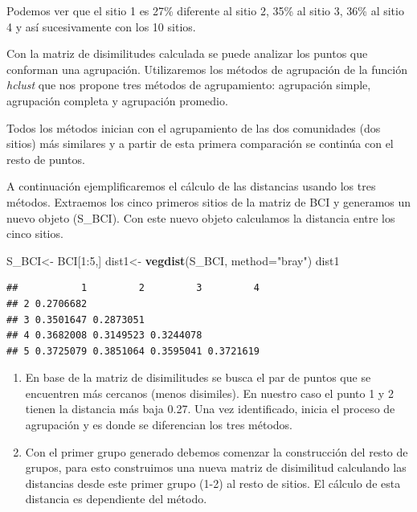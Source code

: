 \documentclass[]{book}
\newenvironment{Shaded}{\begin{snugshade}}{\end{snugshade}}
\newcommand{\KeywordTok}[1]{\textcolor[rgb]{0.13,0.29,0.53}{\textbf{{#1}}}}
\newcommand{\DataTypeTok}[1]{\textcolor[rgb]{0.13,0.29,0.53}{{#1}}}
\newcommand{\DecValTok}[1]{\textcolor[rgb]{0.00,0.00,0.81}{{#1}}}
\newcommand{\StringTok}[1]{\textcolor[rgb]{0.31,0.60,0.02}{{#1}}}
\newcommand{\NormalTok}[1]{{#1}}
\begin{document}
Podemos ver que el sitio 1 es 27\% diferente al sitio 2, 35\% al sitio
3, 36\% al sitio 4 y así sucesivamente con los 10 sitios.

Con la matriz de disimilitudes calculada se puede analizar los puntos
que conforman una agrupación. Utilizaremos los métodos de agrupación de
la función \emph{hclust} que nos propone tres métodos de agrupamiento:
agrupación simple, agrupación completa y agrupación promedio.

Todos los métodos inician con el agrupamiento de las dos comunidades
(dos sitios) más similares y a partir de esta primera comparación se
continúa con el resto de puntos.

A continuación ejemplificaremos el cálculo de las distancias usando los
tres métodos. Extraemos los cinco primeros sitios de la matriz de BCI y
generamos un nuevo objeto (S\_BCI). Con este nuevo objeto calculamos la
distancia entre los cinco sitios.

\begin{Shaded}
\begin{Highlighting}[]
\NormalTok{S_BCI<-}\StringTok{ }\NormalTok{BCI[}\DecValTok{1}\NormalTok{:}\DecValTok{5}\NormalTok{,]}
\NormalTok{dist1<-}\StringTok{ }\KeywordTok{vegdist}\NormalTok{(S_BCI, }\DataTypeTok{method=}\StringTok{"bray"}\NormalTok{)}
\NormalTok{dist1}
\end{Highlighting}
\end{Shaded}

\begin{verbatim}
##           1         2         3         4
## 2 0.2706682                              
## 3 0.3501647 0.2873051                    
## 4 0.3682008 0.3149523 0.3244078          
## 5 0.3725079 0.3851064 0.3595041 0.3721619
\end{verbatim}

\begin{enumerate}
\def\labelenumi{\arabic{enumi}.}
\item
  En base de la matriz de disimilitudes se busca el par de puntos que se
  encuentren más cercanos (menos disimiles). En nuestro caso el punto 1
  y 2 tienen la distancia más baja 0.27. Una vez identificado, inicia el
  proceso de agrupación y es donde se diferencian los tres métodos.
\item
  Con el primer grupo generado debemos comenzar la construcción del
  resto de grupos, para esto construimos una nueva matriz de disimilitud
  calculando las distancias desde este primer grupo (1-2) al resto de
  sitios. El cálculo de esta distancia es dependiente del método.
\end{enumerate}
\end{document}
